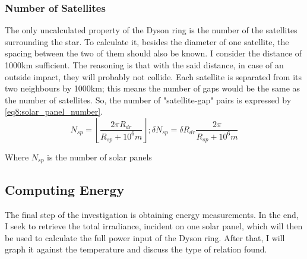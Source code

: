 \documentclass[stu, 11pt, a4paper, floatsintext, noextraspace]{apa7}
\begin{document}
	\subsubsection{Number of Satellites}
	The only uncalculated property of the Dyson ring is the number of the satellites surrounding the star. To calculate it, besides the diameter of one satellite, the spacing between the two of them should also be known. I consider the distance of 1000km sufficient. The reasoning is that with the said distance, in case of an outside impact, they will probably not collide. Each satellite is separated from its two neighbours by 1000km; this means the number of gaps would be the same as the number of satellites. So, the number of "satellite-gap" pairs is expressed by \cref{eq8:solar_panel_number}.
	\begin{equation}
		\label{eq8:solar_panel_number}
		N_{sp}=\left\lfloor\frac{2\pi R_{dr}}{R_{sp} + 10^6m}\right\rfloor; \delta N_{sp}=\delta R_{dr}\frac{2\pi }{R_{sp} + 10^6m}
	\end{equation}
	\begin{center}
		Where $N_{sp}$ is the number of solar panels
	\end{center}
	\subsection{Computing Energy}
	The final step of the investigation is obtaining energy measurements. In the end, I seek to retrieve the total irradiance, incident on one solar panel, which will then be used to calculate the full power input of the Dyson ring. After that, I will graph it against the temperature and discuss the type of relation found.
\end{document}
